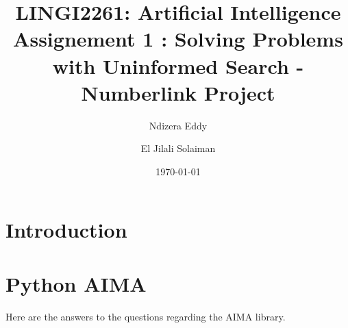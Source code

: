 \documentclass[10pt,a4paper]{article}
\begin{document}
\title{LINGI2261: Artificial Intelligence \\
Assignement 1 : Solving Problems with Uninformed Search - Numberlink Project}
\author{Ndizera Eddy \and El Jilali Solaiman}
\date{\today}
\maketitle

\section*{Introduction}

\section{Python AIMA}

Here are the answers to the questions regarding the AIMA library.
\end{document}

